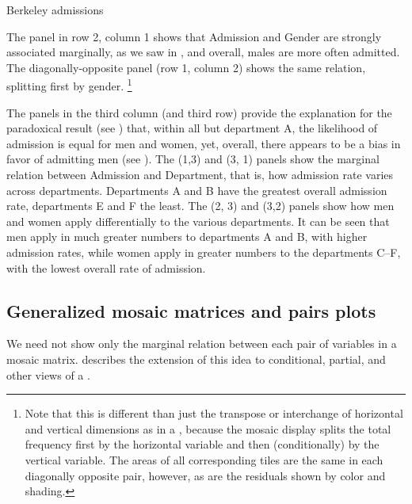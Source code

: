 \documentclass[11pt]{book}\usepackage[]{graphicx}\usepackage[]{color}
\newenvironment{knitrout}{}{} %
\renewenvironment{knitrout}{\small\renewcommand{\baselinestretch}{.85}}{} %
\begin{document}
\begin{Example}[berkeley4]{Berkeley admissions}
\begin{knitrout}
\end{knitrout}

The panel in row 2, column 1
shows that Admission and Gender are
strongly associated marginally, as we saw in ,
and overall, males are more often admitted.
The diagonally-opposite panel (row 1, column 2) shows the
same relation, splitting first by gender.%
\footnote{Note that this is different than just the transpose or interchange
of horizontal and vertical dimensions as in a \scatmat,
because the mosaic display splits the total frequency first by the horizontal
variable and then (conditionally) by the vertical variable.
The areas of all corresponding tiles are the same in each diagonally
opposite pair, however, as are the
residuals shown by color and shading.}

The panels in the third column (and third row)
provide the explanation for the paradoxical
result (see ) that, within all but department A,
the likelihood of admission is equal for men and women,
yet, overall, there appears to be a bias in favor of admitting men
(see ).
The (1,3) and (3, 1) panels show
the marginal relation between Admission and Department, that is, 
how admission rate varies across departments.
Departments A and B have the greatest
overall admission rate, departments E and F the least.
The (2, 3) and (3,2)
panels show how men and women apply differentially to
the various departments.
It can be seen that
men apply in much greater numbers to
departments A and B, with higher admission rates,
while women apply in greater numbers to
the departments C--F, with the lowest overall rate of admission.

\end{Example}

\subsection{Generalized mosaic matrices and pairs plots}\label{sec:condmat}

We need not show only the marginal relation between
each pair of variables in a mosaic matrix.
\citep{Friendly:99:EMD} describes the extension of this idea
to conditional, partial, and other views of a \ctab.
\end{document}
